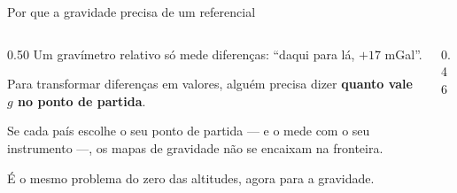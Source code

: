 \documentclass[aspectratio=169,11pt]{beamer}
\newcommand{\bnum}[1]{\textbf{\textcolor{mTeal}{#1}}}
\begin{document}
\begin{frame}{Por que a gravidade precisa de um referencial}
  \begin{columns}[T]
    \begin{column}{0.50\textwidth}
      Um gravímetro relativo só mede diferenças: ``daqui para lá, $+17$ mGal''.
      \medskip

      Para transformar diferenças em valores, alguém precisa dizer \bnum{quanto vale $g$ no
      ponto de partida}.
      \medskip

      Se cada país escolhe o seu ponto de partida --- e o mede com o seu instrumento ---, os
      mapas de gravidade \alert{não se encaixam na fronteira}.
      \medskip

      {\small É o mesmo problema do zero das altitudes, agora para a gravidade.}
    \end{column}
    \begin{column}{0.46\textwidth}
      \centering
    \end{column}
  \end{columns}
\end{frame}
\end{document}
